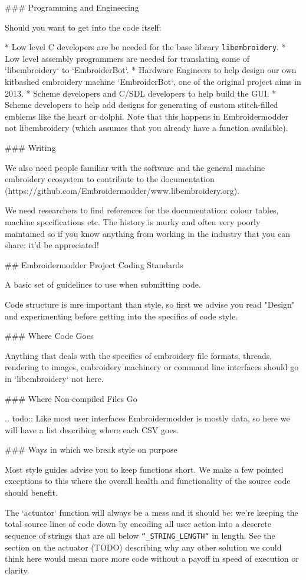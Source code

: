 ### Programming and Engineering

Should you want to get into the code itself:

* Low level C developers are be needed for the base library \texttt{libembroidery}.
* Low level assembly programmers are needed for translating some of `libembroidery` to `EmbroiderBot`.
* Hardware Engineers to help design our own kitbashed embroidery machine `EmbroiderBot`, one of the original project aims in 2013.
* Scheme developers and C/SDL developers to help build the GUI.
* Scheme developers to help add designs for generating of custom stitch-filled emblems like the heart or dolphi. Note that this happens in Embroidermodder not libembroidery (which assumes that you already have a function available).

### Writing

We also need people familiar with the software and the general
machine embroidery ecosystem to contribute to the
documentation (https://github.com/Embroidermodder/www.libembroidery.org).

We need researchers to find references for the documentation: colour tables,
machine specifications etc. The history is murky and often very poorly maintained
so if you know anything from working in the industry that you can share: it'd be
appreciated!

## Embroidermodder Project Coding Standards

A basic set of guidelines to use when submitting code.

Code structure is mre important than style, so first we advise you read
"Design" and experimenting before getting into the specifics of code style.

### Where Code Goes

Anything that deals with the specifics of embroidery file formats, threads,
rendering to images, embroidery machinery or command line interfaces should go 
in `libembroidery` not here.

### Where Non-compiled Files Go

.. todo::
   Like most user interfaces Embroidermodder is mostly data,
   so here we will have a list describing where each CSV goes.

### Ways in which we break style on purpose

Most style guides advise you to keep functions short. We make a few pointed
exceptions to this where the overall health and functionality of the source code should benefit.

The `actuator` function will always be a mess and it should be: we're keeping
the total source lines of code down by encoding all user action into a descrete
sequence of strings that are all below \texttt{``\_STRING\_LENGTH``} in length. See
the section on the actuator (TODO) describing why any other solution we could
think  here would mean more more code without a payoff in speed of execution or
clarity.

